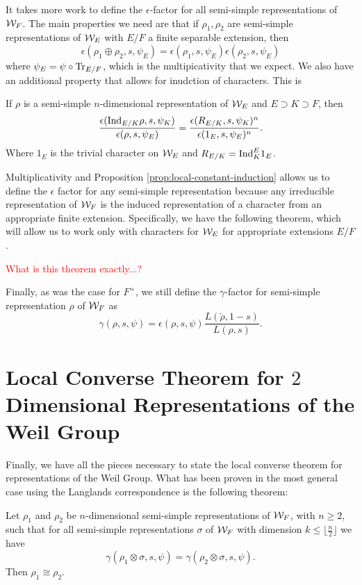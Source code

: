 It takes more work to define the $\epsilon$-factor for all semi-simple representations of $\mathcal{W}_F$.
The main properties we need are that if $\rho_1, \rho_2$ are semi-simple representations of $\mathcal{W}_E$ with $E/F$ a finite separable extension, then
\[\epsilon(\rho_1 \oplus \rho_2,s,\psi_E) = \epsilon(\rho_1,s,\psi_E)\epsilon(\rho_2,s,\psi_E)\]
where $\psi_E = \psi \circ \textrm{Tr}_{E/F}$, which is the multipicativity that we expect.
We also have an additional property that allows for inudction of characters.
This is
\label{prop:local-constant-induction}
\begin{prop}
  If $\rho$ is a semi-simple $n$-dimensional representation of $\mathcal{W}_E$ and $E\supset K \supset F$, then
  \[\frac{\epsilon(\textrm{Ind}_{E/K} \rho, s, \psi_K)}{\epsilon(\rho,s,\psi_E)} = \frac{\epsilon(R_{E/K},s,\psi_K)^n}{\epsilon(1_E,s,\psi_E)^n}.\]
  Where $1_E$ is the trivial character on $\mathcal{W}_E$ and $R_{E/K} = \textrm{Ind}^E_K 1_E$.
\end{prop}
Multiplicativity and Proposition \ref{prop:local-constant-induction} allows us to define the $\epsilon$ factor for any semi-simple representation because any irreducible representation of $\mathcal{W}_F$ is the induced representation of a character from an appropriate finite extension.
Specifically, we have the following theorem, which will allow us to work only with characters for $\mathcal{W}_E$ for appropriate extensions $E/F$.
\begin{theorem}
\textcolor{red}{What is this theorem exactly...?}
\end{theorem}

Finally, as was the case for $F^\times$, we still define the $\gamma$-factor for semi-simple representation $\rho$ of $\mathcal{W}_F$ as
\[\gamma(\rho, s ,\psi) = \epsilon(\rho, s, \psi) \frac{L(\check{\rho},1-s)}{L(\rho,s)}.\]

\section{Local Converse Theorem for $2$ Dimensional Representations of the Weil Group}
\label{sec:n=2-LCT-weil-group}
Finally, we have all the pieces necessary to state the local converse theorem for representations of the Weil Group.
What has been proven in the most general case using the Langlands correspondence is the following theorem:

\begin{theorem}
  Let $\rho_1$ and $\rho_2$ be $n$-dimensional semi-simple representations of $\mathcal{W}_F$, with $n \geq 2$, such that for all semi-simple representations $\sigma$ of $\mathcal{W}_F$ with dimension $k \leq \lfloor \frac{n}{2} \rfloor$ we have
  \[\gamma(\rho_1 \otimes \sigma,s,\psi) = \gamma(\rho_2 \otimes \sigma,s,\psi).\]
  Then $\rho_1 \cong \rho_2$.
\end{theorem}


